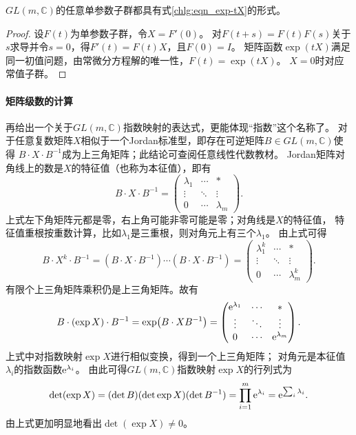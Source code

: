 \begin{proposition}\label{chlg:thm_GL-expA}
    $GL(m,\mathbb{C})$的任意单参数子群都具有式\eqref{chlg:eqn_exp-tX}的形式。
\end{proposition}
\begin{proof}
设$F(t)$为单参数子群，令$X=F'(0)$。
对$F(t+s)=F(t)F(s)$关于$s$求导并令$s=0$，得$F'(t)=F(t)X$，且$F(0)=I$。
矩阵函数$\exp(tX)$满足同一初值问题，由常微分方程解的唯一性，$F(t)=\exp(tX)$。
$X=0$时对应常值子群。
\end{proof}

\paragraph{矩阵级数的计算}
再给出一个关于$GL(m,\mathbb{C})$指数映射的表达式，更能体现“指数”这个名称了。
对于任意复数矩阵$X$相似于一个Jordan标准型，即存在可逆矩阵$B\in GL(m,\mathbb{C})$使得
$B\cdot X \cdot B^{-1}$成为上三角矩阵；此结论可查阅任意线性代数教材。
Jordan矩阵对角线上的数是$X$的特征值（也称为本征值），即有
\begin{equation}
    B\cdot X \cdot B^{-1} =
    \begin{pmatrix}
        \lambda_1 & \cdots &*\\
        \vdots & \ddots &\vdots \\
        0 &\cdots & \lambda_m
    \end{pmatrix}.
\end{equation}
上式左下角矩阵元都是零，右上角可能非零可能是零；对角线是$X$的特征值，
特征值重根按重数计算，比如$\lambda_1$是三重根，则对角元上有三个$\lambda_1$。
由上式可得
\begin{equation*}
    B\cdot X^k \cdot B^{-1} =
    (B\cdot X \cdot B^{-1})\cdots (B\cdot X \cdot B^{-1})=
    \begin{pmatrix}
        \lambda_1^k & \cdots &*\\
        \vdots & \ddots &\vdots \\
        0 &\cdots & \lambda_m^k
    \end{pmatrix} .
\end{equation*}
有限个上三角矩阵乘积仍是上三角矩阵。故有
\begin{equation}
    B\cdot (\exp X) \cdot B^{-1} = \exp(B\cdot X B^{-1})=
    \begin{pmatrix}
        \mathrm{e}^{\lambda_1} & \cdots &*\\
        \vdots & \ddots &\vdots \\
        0 &\cdots & \mathrm{e}^{\lambda_m}
    \end{pmatrix}.
\end{equation}
上式中对指数映射$\exp X$进行相似变换，得到一个上三角矩阵；
对角元是本征值$\lambda_i$的指数函数$\mathrm{e}^{\lambda_i}$。
由此可得$GL(m,\mathbb{C})$指数映射$\exp X$的行列式为
\begin{equation}
    \det (\exp X) = (\det B) (\det \exp X) (\det B^{-1})
    = \prod_{i=1}^m \mathrm{e}^{\lambda_i} = \mathrm{e}^{\sum_i {\lambda_i}} .
\end{equation}
由上式更加明显地看出$\det (\exp X) \neq 0$。

